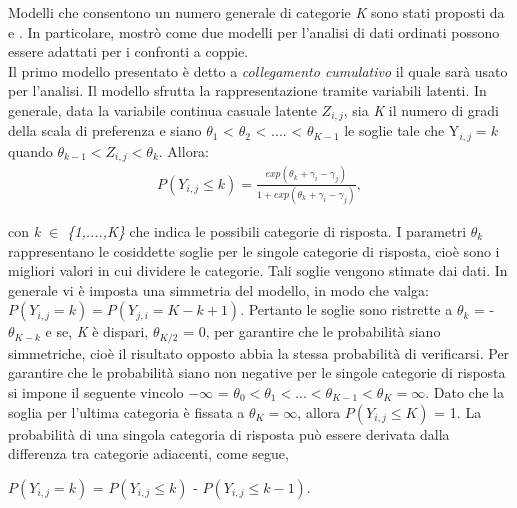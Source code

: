 Modelli che consentono un numero generale di categorie \emph{K} sono stati proposti da \textcite{bradley1952rank} e \textcite{tutz1986bradley}. In particolare, \textcite{tutz1986bradley} mostrò come due modelli per l'analisi di dati ordinati possono essere adattati per i confronti a coppie.\\

Il primo modello presentato è detto a \emph{collegamento cumulativo} il quale sarà usato per l'analisi. Il modello sfrutta la rappresentazione tramite variabili latenti. In generale, data la variabile continua casuale latente $Z_{i,j}$, sia \emph{K} il numero di gradi della scala di preferenza e siano $\theta_{1} $ < $\theta_{2}$ < .... < $\theta_{K-1}$ le soglie tale che Y$_{i,j} = k$ quando $\theta_{k-1} < Z_{i,j} < \theta_{k}$. Allora:
\begin{align}
	P(Y_{i,j}\leq k) =  \frac{exp(\theta_{k} + \gamma_{i} - \gamma_{j})}{1 + exp(\theta_{k} + \gamma_{i} - \gamma_{j})} \label{for:3.2.1},
\end{align}

con \emph{k $\in$ \{1,....,K\}} che indica le possibili categorie di risposta. I parametri $\theta_{k}$ rappresentano le cosiddette soglie per le singole categorie di risposta, cioè sono i migliori valori in cui dividere le categorie. Tali soglie vengono stimate dai dati. %
In generale vi è imposta una simmetria del modello, in modo che valga: $P(Y_{i,j} = k) = P(Y_{j,i} = K - k + 1)$. Pertanto le soglie sono ristrette a $\theta_{k}$ = -$\theta_{K-k}$ e se, \emph{K} è dispari, $\theta_{K/2}$ = 0, per garantire che le probabilità siano simmetriche, cioè il risultato opposto abbia la stessa probabilità di verificarsi. Per garantire che le probabilità siano non negative per le singole categorie di risposta si impone il seguente vincolo $-\infty$ = $\theta_{0} < \theta_{1} < ... < \theta_{K-1} < \theta_{K} = \infty$. Dato che la soglia per l'ultima categoria è fissata a $\theta_{K} = \infty$, allora $P(Y_{i,j} \leq K)$ = 1. La probabilità di una singola categoria di risposta può essere derivata dalla differenza tra categorie adiacenti, come segue,
\begin{center}
	$P(Y_{i,j} = k)$ = $P(Y_{i,j} \leq k)$ - $P(Y_{i,j} \leq k - 1)$.
\end{center}

